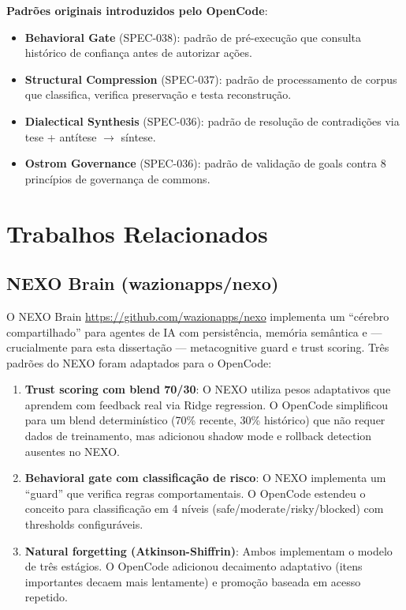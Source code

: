 \textbf{Padrões originais introduzidos pelo OpenCode}:
\begin{itemize}
    \item \textbf{Behavioral Gate} (SPEC-038): padrão de pré-execução que consulta histórico de confiança antes de autorizar ações.
    \item \textbf{Structural Compression} (SPEC-037): padrão de processamento de corpus que classifica, verifica preservação e testa reconstrução.
    \item \textbf{Dialectical Synthesis} (SPEC-036): padrão de resolução de contradições via tese + antítese $\rightarrow$ síntese.
    \item \textbf{Ostrom Governance} (SPEC-036): padrão de validação de goals contra 8 princípios de governança de commons.
\end{itemize}

\section{Trabalhos Relacionados}

\subsection{NEXO Brain (wazionapps/nexo)}

O NEXO Brain \url{https://github.com/wazionapps/nexo} implementa um ``cérebro compartilhado'' para agentes de IA com persistência, memória semântica e — crucialmente para esta dissertação — metacognitive guard e trust scoring. Três padrões do NEXO foram adaptados para o OpenCode:

\begin{enumerate}
    \item \textbf{Trust scoring com blend 70/30}: O NEXO utiliza pesos adaptativos que aprendem com feedback real via Ridge regression. O OpenCode simplificou para um blend determinístico (70\% recente, 30\% histórico) que não requer dados de treinamento, mas adicionou shadow mode e rollback detection ausentes no NEXO.
    \item \textbf{Behavioral gate com classificação de risco}: O NEXO implementa um ``guard'' que verifica regras comportamentais. O OpenCode estendeu o conceito para classificação em 4 níveis (safe/moderate/risky/blocked) com thresholds configuráveis.
    \item \textbf{Natural forgetting (Atkinson-Shiffrin)}: Ambos implementam o modelo de três estágios. O OpenCode adicionou decaimento adaptativo (itens importantes decaem mais lentamente) e promoção baseada em acesso repetido.
\end{enumerate}

